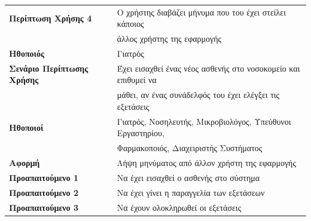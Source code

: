 \documentclass{article}
\newcommand\T{\rule{0pt}{2.6ex}}       %
\newcommand\B{\rule[-1.2ex]{0pt}{0pt}}
\begin{document}
\begin{center}
     \begin{tabular}{|l|l|}
     \hline
      \textbf{Περίπτωση Χρήσης 4} & Ο χρήστης διαβάζει μήνυμα που του έχει στείλει κάποιος \T \\& άλλος χρήστης της εφαρμογής \B \\ 
      \hline
      \textbf{Ηθοποιός} & Γιατρός \T\B \\
      \hline
      \textbf{Σενάριο Περίπτωσης Χρήσης} & Έχει εισαχθεί ένας νέος ασθενής στο νοσοκομείο και επιθυμεί να \T \\& μάθει, αν ένας συνάδελφός του έχει ελέγξει τις εξετάσεις \B \\
      \hline
      \textbf{Ηθοποιοί} & Γιατρός, Νοσηλευτής, Μικροβιολόγος, Υπεύθυνοι Εργαστηρίου, \T \\& Φαρμακοποιός, Διαχειριστής Συστήματος \B \\
      \hline
      \textbf{Αφορμή} & Λήψη μηνύματος από άλλον χρήστη της εφαρμογής \T\B \\
      \hline
      \textbf{Προαπαιτούμενο 1} & Να έχει εισαχθεί ο ασθενής στο σύστημα \T\B \\
      \hline
      \textbf{Προαπαιτούμενο 2} & Να έχει γίνει η παραγγελία των εξετάσεων \T\B \\
      \hline
      \textbf{Προαπαιτούμενο 3} & Να έχουν ολοκληρωθεί οι εξετάσεις \T\B \\
      \hline
     \end{tabular}
 \end{center}
 
 \vspace{0.2cm}
 
\end{document}
